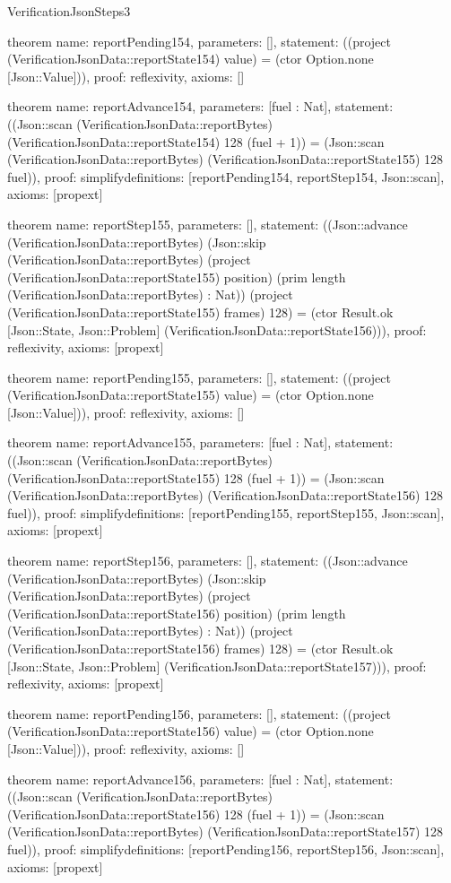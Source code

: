 \begin{lexlean}{VerificationJsonSteps3}
\begin{semanticmodule}
theorem{
  name: reportPending154,
  parameters: [],
  statement: ((project (VerificationJsonData::reportState154) value) = (ctor Option.none [Json::Value])),
  proof: reflexivity{},
  axioms: []
}

theorem{
  name: reportAdvance154,
  parameters: [fuel : Nat],
  statement: ((Json::scan (VerificationJsonData::reportBytes) (VerificationJsonData::reportState154) 128 (fuel + 1)) = (Json::scan (VerificationJsonData::reportBytes) (VerificationJsonData::reportState155) 128 fuel)),
  proof: simplify{definitions: [reportPending154, reportStep154, Json::scan]},
  axioms: [propext]
}

theorem{
  name: reportStep155,
  parameters: [],
  statement: ((Json::advance (VerificationJsonData::reportBytes) (Json::skip (VerificationJsonData::reportBytes) (project (VerificationJsonData::reportState155) position) (prim length (VerificationJsonData::reportBytes) : Nat)) (project (VerificationJsonData::reportState155) frames) 128) = (ctor Result.ok [Json::State, Json::Problem] (VerificationJsonData::reportState156))),
  proof: reflexivity{},
  axioms: [propext]
}

theorem{
  name: reportPending155,
  parameters: [],
  statement: ((project (VerificationJsonData::reportState155) value) = (ctor Option.none [Json::Value])),
  proof: reflexivity{},
  axioms: []
}

theorem{
  name: reportAdvance155,
  parameters: [fuel : Nat],
  statement: ((Json::scan (VerificationJsonData::reportBytes) (VerificationJsonData::reportState155) 128 (fuel + 1)) = (Json::scan (VerificationJsonData::reportBytes) (VerificationJsonData::reportState156) 128 fuel)),
  proof: simplify{definitions: [reportPending155, reportStep155, Json::scan]},
  axioms: [propext]
}

theorem{
  name: reportStep156,
  parameters: [],
  statement: ((Json::advance (VerificationJsonData::reportBytes) (Json::skip (VerificationJsonData::reportBytes) (project (VerificationJsonData::reportState156) position) (prim length (VerificationJsonData::reportBytes) : Nat)) (project (VerificationJsonData::reportState156) frames) 128) = (ctor Result.ok [Json::State, Json::Problem] (VerificationJsonData::reportState157))),
  proof: reflexivity{},
  axioms: [propext]
}

theorem{
  name: reportPending156,
  parameters: [],
  statement: ((project (VerificationJsonData::reportState156) value) = (ctor Option.none [Json::Value])),
  proof: reflexivity{},
  axioms: []
}

theorem{
  name: reportAdvance156,
  parameters: [fuel : Nat],
  statement: ((Json::scan (VerificationJsonData::reportBytes) (VerificationJsonData::reportState156) 128 (fuel + 1)) = (Json::scan (VerificationJsonData::reportBytes) (VerificationJsonData::reportState157) 128 fuel)),
  proof: simplify{definitions: [reportPending156, reportStep156, Json::scan]},
  axioms: [propext]
}


\end{semanticmodule}
\end{lexlean}
